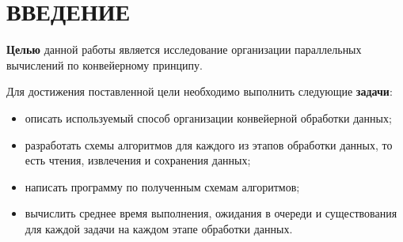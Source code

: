 \chapter*{ВВЕДЕНИЕ}

\textbf{Целью} данной работы является исследование организации параллельных вычислений по конвейерному принципу.

Для достижения поставленной цели необходимо выполнить следующие \textbf{задачи}:
\begin{itemize}
	\item
        описать используемый способ организации конвейерной обработки данных;
    
    \item
        разработать схемы алгоритмов для каждого из этапов обработки данных, то есть чтения, извлечения и сохранения данных;

    \item
        написать программу по полученным схемам алгоритмов;
    
	\item
        вычислить среднее время выполнения, ожидания в очереди и существования для каждой задачи на каждом этапе обработки данных.
        
\end{itemize}